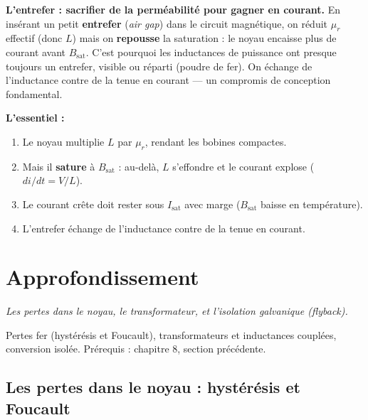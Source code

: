 \documentclass[12pt,a4paper,twoside]{book}
\begin{document}
\begin{intuition}
\textbf{L'entrefer : sacrifier de la perméabilité pour gagner en courant.} En insérant un petit \textbf{entrefer} (\textit{air gap}) dans le circuit magnétique, on réduit $\mu_r$ effectif (donc $L$) mais on \textbf{repousse} la saturation : le noyau encaisse plus de courant avant $B_{\text{sat}}$. C'est pourquoi les inductances de puissance ont presque toujours un entrefer, visible ou réparti (poudre de fer). On échange de l'inductance contre de la tenue en courant --- un compromis de conception fondamental.
\end{intuition}

\begin{retenir}
\textbf{L'essentiel :}
\begin{enumerate}[nosep]
\item Le noyau multiplie $L$ par $\mu_r$, rendant les bobines compactes.
\item Mais il \textbf{sature} à $B_{\text{sat}}$ : au-delà, $L$ s'effondre et le courant explose ($di/dt = V/L$).
\item Le courant crête doit rester sous $I_{\text{sat}}$ avec marge ($B_{\text{sat}}$ baisse en température).
\item L'entrefer échange de l'inductance contre de la tenue en courant.
\end{enumerate}
\end{retenir}

\section{Approfondissement}

\vspace{0.3cm}
\textit{Les pertes dans le noyau, le transformateur, et l'isolation galvanique (flyback).}
\vspace{0.3cm}

\begin{approfondissement}
Pertes fer (hystérésis et Foucault), transformateurs et inductances couplées, conversion isolée. Prérequis : chapitre 8, section précédente.
\end{approfondissement}

\subsection{Les pertes dans le noyau : hystérésis et Foucault}
\end{document}
